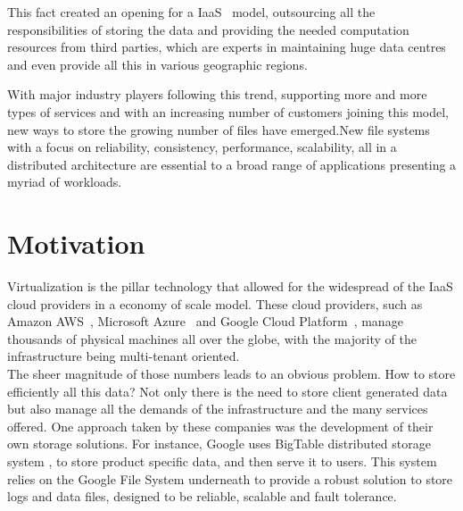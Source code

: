 This fact created an opening for a \gls{IaaS}~\cite{Mell2011} model, outsourcing all the responsibilities of storing the data and providing the needed computation resources from third parties, which are experts in maintaining huge data centres and even provide all this in various geographic regions.
%

With major industry players following this trend, supporting more and more types of services and with an increasing number of customers joining this model, new ways to store the growing number of files have emerged.New file systems with a focus on reliability, consistency, performance, scalability, all in a distributed architecture are essential to a broad range of applications presenting a myriad of workloads.



\section{Motivation} %
\label{sec:motivation}

Virtualization is the pillar technology that allowed for the widespread of the IaaS cloud providers in a economy of scale model. These cloud providers, such as Amazon AWS~\cite{aws_2017}, Microsoft Azure~\cite{azure_2017} and Google Cloud Platform~\cite{gcp_2017}, manage thousands of physical machines all over the globe, with the majority of the infrastructure being multi-tenant oriented. 
\\
%
The sheer magnitude of those numbers leads to an obvious problem. How to store efficiently all this data? 
Not only there is the need to store client generated data but also manage all the demands of the infrastructure and the many services offered. 
One approach taken by these companies was the development of their own storage solutions. For instance, Google uses BigTable distributed storage system \cite{Chang2006}, to store product specific data, and then serve it to users. This system relies on the Google File System underneath to provide a robust solution to store logs and data files, designed to be reliable, scalable and fault tolerance.
\\
%


